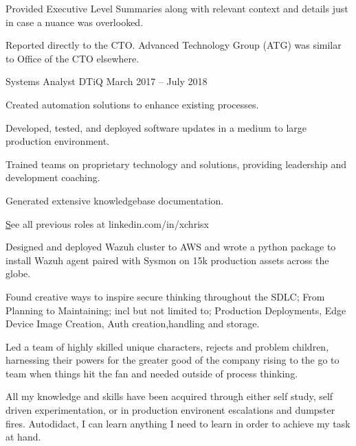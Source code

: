 \documentclass[]{resume-format}
\begin{document}
\begin{cventries}
{\begin{cvitems}
        \item { Provided Executive Level Summaries along with relevant context and details just in case a nuance was overlooked. }
        \item { Reported directly to the CTO. Advanced Technology Group (ATG) was similar to Office of the CTO elsewhere. }
    \end{cvitems}}
    \cventry
    { Systems Analyst }
    { DTiQ }
    {}
    { March 2017 – July 2018 }
    {\begin{cvitems}
        \item { Created automation solutions to enhance existing processes. }
        \item { Developed, tested, and deployed software updates in a medium to large production environment. }
        \item { Trained teams on proprietary technology and solutions, providing leadership and development coaching. }
        \item { Generated extensive knowledgebase documentation. }
    \end{cvitems}}
\end{cventries}

    \vspace{-5mm}
    \begin{flushright}
        \small\color{lightgray} \href{ https://linkedin.com/in/xchrisx }See all previous roles at linkedin.com/in/xchrisx
    \end{flushright}




\begin{cvachievements}
    \item { Designed and deployed Wazuh cluster to AWS and wrote a python package to install Wazuh agent paired with Sysmon on 15k production assets across the globe. }
    \item { Found creative ways to inspire secure thinking throughout the SDLC; From Planning to Maintaining; incl but not limited to; Production Deployments, Edge Device Image Creation, Auth creation,handling and storage. }
    \item { Led a team of highly skilled unique characters, rejects and problem children, harnessing their powers for the greater good of the company rising to the go to team when things hit the fan and needed outside of process thinking. }
    \item { All my knowledge and skills have been acquired through either self study, self driven experimentation, or in production environent escalations and dumpster fires. Autodidact, I can learn anything I need to learn in order to achieve my task at hand. }
\end{cvachievements}
\end{document}
